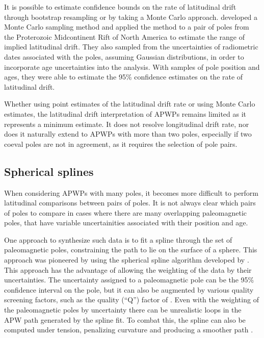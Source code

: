 \documentclass[11pt,letterpaper]{article}
\begin{document}
It is possible to estimate confidence bounds on the rate of latitudinal drift through bootstrap resampling \citep[e.g.][]{Tarduno1990b} or by taking a Monte Carlo approach. \citet{Swanson-Hysell2014b} developed a Monte Carlo sampling method and applied the method to a pair of poles from the Proterozoic Midcontinent Rift of North America to estimate the range of implied latitudinal drift. They also sampled from the uncertainties of radiometric dates associated with the poles, assuming Gaussian distributions, in order to incorporate age uncertainties into the analysis. With samples of pole position and ages, they were able to estimate the 95\% confidence estimates on the rate of latitudinal drift.

Whether using point estimates of the latitudinal drift rate or using Monte Carlo estimates, the latitudinal drift interpretation of APWPs remains limited as it represents a minimum estimate. It does not resolve longitudinal drift rate, nor does it naturally extend to APWPs with more than two poles, especially if two coeval poles are not in agreement, as it requires the selection of pole pairs.

\subsection*{Spherical splines}
When considering APWPs with many poles, it becomes more difficult to perform latitudinal comparisons between pairs of poles. It is not always clear which pairs of poles to compare in cases where there are many overlapping paleomagnetic poles, that have variable uncertainities associated with their position and age.

One approach to synthesize such data is to fit a spline through the set of paleomagnetic poles, constraining the path to lie on the surface of a sphere. This approach was pioneered by \citet{Torsvik1992a} using the spherical spline algorithm developed by \citet{Jupp1987a}. This approach has the advantage of allowing the weighting of the data by their uncertainties. The uncertainty assigned to a paleomagnetic pole can be the 95\% confidence interval on the pole, but it can also be augmented by various quality screening factors, such as the quality (``Q'') factor of \citet{Van-der-Voo1990a} \citep{Torsvik1992a}. Even with the weighting of the paleomagnetic poles by uncertainty there can be unrealistic loops in the APW path generated by the spline fit. To combat this, the spline can also be computed under tension, penalizing curvature and producing a smoother path \citep{Torsvik1996a}.
\end{document}
